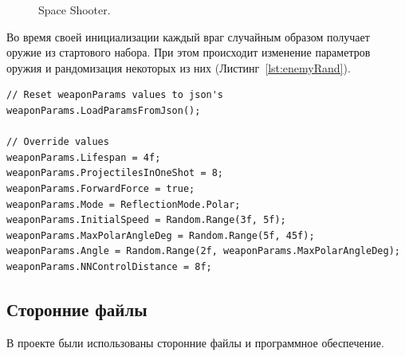 \begin{figure}[ht]
    \begin{center}

        \caption{
            \label{SpaceShooter}
            Space Shooter.
        }
    \end {center}
\end {figure}

Во время своей инициализации каждый враг случайным образом получает оружие из стартового набора. При этом происходит изменение параметров оружия и рандомизация некоторых из них (Листинг~\ref{lst:enemyRand}).

\begin{lstlisting}[name=enemyRand, caption={Инициализация параметров вражеского оружия}, label={lst:enemyRand}]
// Reset weaponParams values to json's
weaponParams.LoadParamsFromJson();

// Override values
weaponParams.Lifespan = 4f;
weaponParams.ProjectilesInOneShot = 8;
weaponParams.ForwardForce = true;
weaponParams.Mode = ReflectionMode.Polar;
weaponParams.InitialSpeed = Random.Range(3f, 5f);
weaponParams.MaxPolarAngleDeg = Random.Range(5f, 45f);
weaponParams.Angle = Random.Range(2f, weaponParams.MaxPolarAngleDeg);
weaponParams.NNControlDistance = 8f;
\end{lstlisting}

\pagebreak

\subsection{Сторонние файлы}

В проекте были использованы сторонние файлы и программное обеспечение.

